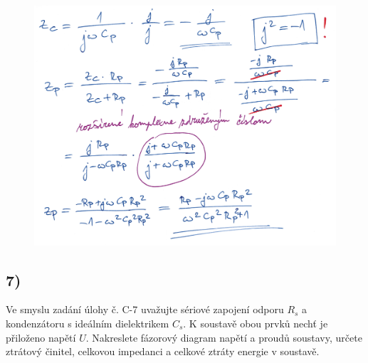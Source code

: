 \begin{figure}[h]
    \centering
    \includegraphics*[width=\textwidth]{images/diel6_1.jpg}
\end{figure}

\newpage


\subsection*{7)}
Ve smyslu zadání úlohy č. C-7 uvažujte sériové zapojení odporu $R_s$ a kondenzátoru s ideálním dielektrikem $C_s$. K soustavě obou prvků nechť je přiloženo napětí $U$. Nakreslete fázorový diagram napětí a proudů soustavy, určete ztrátový činitel, celkovou impedanci a celkové ztráty energie v soustavě.

